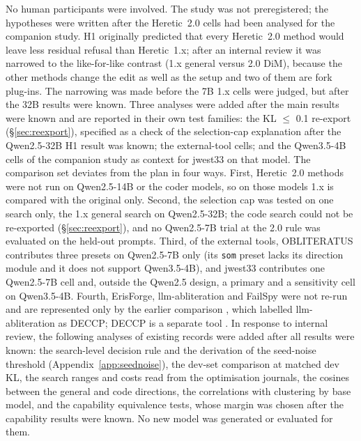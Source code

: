 No human participants were involved. The study was not preregistered; the hypotheses were written after the
Heretic~2.0 cells had been analysed for the companion study. H1 originally predicted that every Heretic~2.0 method
would leave less residual refusal than Heretic~1.x; after an internal review it was narrowed to the like-for-like
contrast (1.x general versus 2.0 DiM), because the other methods change the edit as well as the setup and two of
them are fork plug-ins. The narrowing was made before the 7B 1.x cells were judged, but after the 32B results were
known. Three analyses were added after the main results were known and are reported in their own test families:
the KL $\le$ 0.1 re-export (\S\ref{sec:reexport}), specified as a check of the selection-cap explanation after
the Qwen2.5-32B H1 result was known; the external-tool cells; and the Qwen3.5-4B cells of the companion study as context for jwest33 on
that model. The comparison set deviates from the plan in four ways. First, Heretic~2.0 methods were not run on
Qwen2.5-14B or the coder models, so on those models 1.x is compared with the original only. Second, the selection
cap was tested on one search only, the 1.x general search on Qwen2.5-32B; the code search could not be re-exported
(\S\ref{sec:reexport}), and no Qwen2.5-7B trial at the 2.0 rule was evaluated on the held-out prompts. Third, of the external tools, OBLITERATUS contributes
three presets on Qwen2.5-7B only (its \texttt{som} preset lacks its direction module and it does not support
Qwen3.5-4B), and jwest33 contributes one Qwen2.5-7B cell and, outside the Qwen2.5 design, a primary and a
sensitivity cell on Qwen3.5-4B. Fourth, ErisForge, llm-abliteration \cite{jimplus_llmabliteration} and FailSpy were not re-run and are represented
only by the earlier comparison \cite{young2025comparative}, which labelled llm-abliteration as DECCP; DECCP is a
separate tool \cite{lin2024deccp}. In response to internal review, the following analyses of existing records were
added after all results were known: the search-level decision rule and the derivation of the seed-noise threshold
(Appendix~\ref{app:seednoise}), the dev-set comparison at matched dev KL, the search ranges and costs read from the
optimisation journals, the cosines between the general and code directions, the correlations with clustering by base
model, and the capability equivalence tests, whose margin was chosen after the capability results were known. No new
model was generated or evaluated for them.
